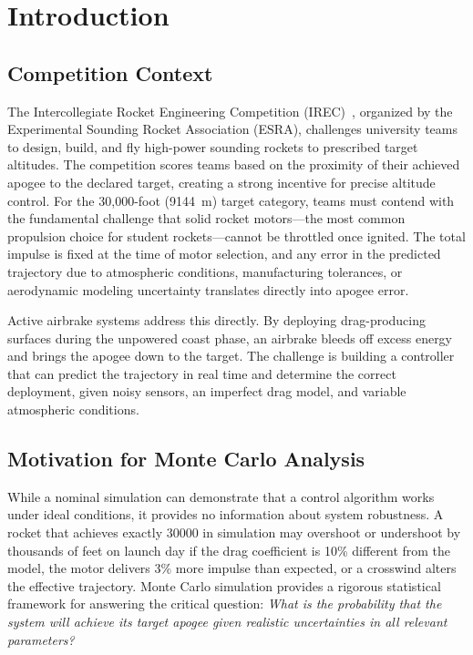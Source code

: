 \documentclass[11pt,letterpaper]{article}
\begin{document}
\newpage

\section{Introduction}
\label{sec:introduction}

\subsection{Competition Context}
\label{sec:intro_context}

The Intercollegiate Rocket Engineering Competition (IREC)~\cite{irec2024}, organized by the Experimental Sounding Rocket Association (ESRA), challenges university teams to design, build, and fly high-power sounding rockets to prescribed target altitudes. The competition scores teams based on the proximity of their achieved apogee to the declared target, creating a strong incentive for precise altitude control. For the 30{,}000-foot (\SI{9144}{\metre}) target category, teams must contend with the fundamental challenge that solid rocket motors---the most common propulsion choice for student rockets---cannot be throttled once ignited. The total impulse is fixed at the time of motor selection, and any error in the predicted trajectory due to atmospheric conditions, manufacturing tolerances, or aerodynamic modeling uncertainty translates directly into apogee error.

Active airbrake systems address this directly. By deploying drag-producing surfaces during the unpowered coast phase, an airbrake bleeds off excess energy and brings the apogee down to the target. The challenge is building a controller that can predict the trajectory in real time and determine the correct deployment, given noisy sensors, an imperfect drag model, and variable atmospheric conditions.

\subsection{Motivation for Monte Carlo Analysis}
\label{sec:intro_motivation}

While a nominal simulation can demonstrate that a control algorithm works under ideal conditions, it provides no information about system robustness. A rocket that achieves exactly \SI{30000}{\ft} in simulation may overshoot or undershoot by thousands of feet on launch day if the drag coefficient is 10\% different from the model, the motor delivers 3\% more impulse than expected, or a crosswind alters the effective trajectory. Monte Carlo simulation provides a rigorous statistical framework for answering the critical question: \textit{What is the probability that the system will achieve its target apogee given realistic uncertainties in all relevant parameters?}
\end{document}

